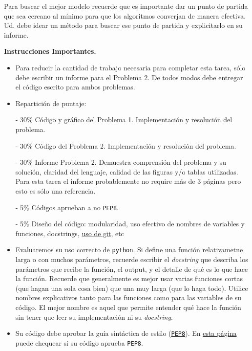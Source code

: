 \documentclass[letter, 11pt]{article}
\begin{document}
Para buscar el mejor modelo recuerde que es importante dar un punto de partida
que sea cercano al mínimo para que los algoritmos converjan de manera efectiva.
Ud. debe idear un método para buscar ese punto de partida y explicitarlo en su
informe.



\vspace{2em}
\noindent\textbf{Instrucciones Importantes.}
\begin{itemize}

\item Para reducir la cantidad de trabajo necesaria para completar esta tarea,
  sólo debe escribir un informe para el Problema 2. De todos modos debe
  entregar el código escrito para ambos problemas.

 \item Repartición de puntaje:

   \subitem - 30\% Código y gráfico del Problema 1. Implementación y resolución
   del problema.
     
   \subitem - 30\% Código del Problema 2. Implementación y resolución del
   problema.

   \subitem - 30\% Informe Problema 2. Demuestra comprensión del problema y su
   solución, claridad del lenguaje, calidad de las figuras y/o tablas
   utilizadas. Para esta tarea el informe probablemente no require más de 3
   páginas pero esto es sólo una referencia.

   \subitem - 5\% Códigos aprueban a no \texttt{PEP8}.

   \subitem - 5\% Diseño del código: modularidad, uso efectivo de nombres de
   variables y funciones, docstrings, \underline{uso de git}, etc

\item Evaluaremos su uso correcto de \texttt{python}. Si define una función
  relativametne larga o con muchos parámetros, recuerde escribir el
  \emph{docstring} que describa los parámetros que recibe la función, el
  output, y el detalle de qué es lo que hace la función. Recuerde que
  generalmente es mejor usar varias funciones cortas (que hagan una sola cosa
  bien) que una muy larga (que lo haga todo).  Utilice nombres explicativos
  tanto para las funciones como para las variables de su código. El mejor
  nombre es aquel que permite entender qué hace la función sin tener que leer
  su implementación ni su \emph{docstring}.

\item Su código debe aprobar la guía sintáctica de estilo
  (\href{https://www.python.org/dev/peps/pep-0008/}{\texttt{PEP8}}). En
  \href{http://pep8online.com}{esta página} puede chequear si su código aprueba
  \texttt{PEP8}.


\end{itemize}
\end{document}
